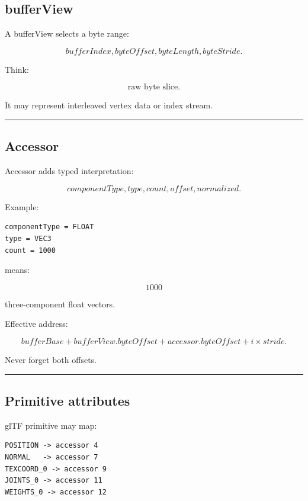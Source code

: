 \subsection{bufferView}\label{04-visual-computing-ii-ch041-bufferview}

A bufferView selects a byte range:

\[
bufferIndex,
byteOffset,
byteLength,
byteStride.
\]

Think:

\[
\boxed{
\text{raw byte slice}.
}
\]

It may represent interleaved vertex data or index stream.

\begin{center}\rule{0.5\linewidth}{0.5pt}\end{center}

\subsection{Accessor}\label{04-visual-computing-ii-ch041-accessor}

Accessor adds typed interpretation:

\[
componentType,
type,
count,
offset,
normalized.
\]

Example:

\begin{verbatim}
componentType = FLOAT
type = VEC3
count = 1000
\end{verbatim}

means:

\[
1000
\]

three-component float vectors.

Effective address:

\[
\boxed{
bufferBase
+
bufferView.byteOffset
+
accessor.byteOffset
+
i\times stride.
}
\]

Never forget both offsets.

\begin{center}\rule{0.5\linewidth}{0.5pt}\end{center}

\subsection{Primitive attributes}\label{04-visual-computing-ii-ch041-primitive-attributes}

glTF primitive may map:

\begin{verbatim}
POSITION -> accessor 4
NORMAL   -> accessor 7
TEXCOORD_0 -> accessor 9
JOINTS_0 -> accessor 11
WEIGHTS_0 -> accessor 12
\end{verbatim}

